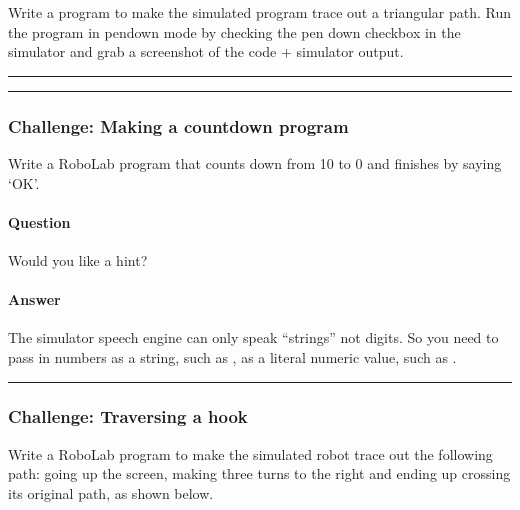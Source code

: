\documentclass[letterpaper,10pt,english]{sphinxmanual}
\let\sphinxpxdimen\pdfpxdimen\else\newdimen\sphinxpxdimen
\begin{document}
Write a program to make the simulated program trace out a triangular path. Run the program in pen\sphinxhyphen{}down mode by checking the pen down checkbox in the simulator and grab a screenshot of the code + simulator output.


\sphinxincludegraphics[width=107\sphinxpxdimen,height=108\sphinxpxdimen]{{tm129_rob_p3_f021}.gif}


\bigskip\hrule\bigskip



\bigskip\hrule\bigskip



\subsubsection{Challenge: Making a countdown program}
\label{\detokenize{content/02_Robot_Lab/Section_00_03:Challenge:-Making-a-countdown-program}}
Write a RoboLab program that counts down from 10 to 0 and finishes by saying ‘OK’.


\paragraph{Question}
\label{\detokenize{content/02_Robot_Lab/Section_00_03:Question}}
Would you like a hint?


\paragraph{Answer}
\label{\detokenize{content/02_Robot_Lab/Section_00_03:Answer}}
The simulator speech engine can only speak “strings” not digits. So you need to pass in numbers as a string, such as \sphinxcode{\sphinxupquote{\textquotesingle{}2\textquotesingle{}}},  as a literal numeric value, such as .


\bigskip\hrule\bigskip



\subsubsection{Challenge: Traversing a hook}
\label{\detokenize{content/02_Robot_Lab/Section_00_03:Challenge:-Traversing-a-hook}}
Write a RoboLab program to make the simulated robot trace out the following path: going up the screen, making three turns to the right and ending up crossing its original path, as shown below.
\end{document}
